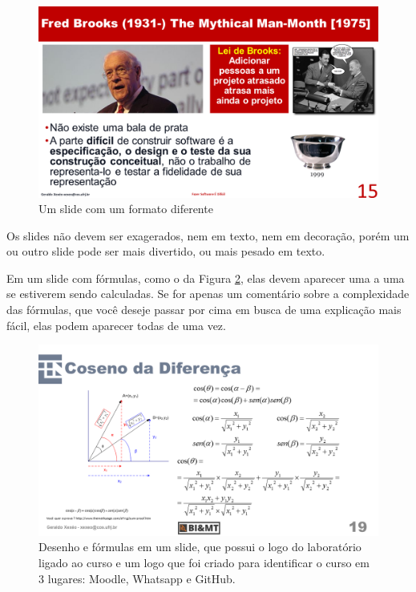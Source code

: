 \documentclass{article}
\def\tam{0.6}
\begin{document}
\begin{figure}[htb]
    \centering
    \includegraphics[width=\tam\linewidth]{imagens/manmonth.png}
    \caption{Um slide com um formato diferente}
    \label{fig:man}
\end{figure}


Os slides não devem ser exagerados, nem em texto, nem em decoração, porém um ou outro slide pode ser mais divertido, ou mais pesado em texto.

Em um slide com fórmulas, como o da Figura \ref{fig:formulas}, elas devem aparecer uma a uma se estiverem sendo calculadas. Se for apenas um comentário sobre a complexidade das fórmulas, que você deseje passar por cima em busca de uma explicação mais fácil, elas podem aparecer todas de uma vez.

\begin{figure}[hbt]
    \centering
    \includegraphics[width=\tam\linewidth]{imagens/desenhoeformulas.png}
    \caption{Desenho e fórmulas em um slide, que possui o logo do laboratório ligado ao curso e um logo que foi criado para identificar o curso em 3 lugares: Moodle, Whatsapp e GitHub.}
    \label{fig:formulas}
\end{figure}
\end{document}
